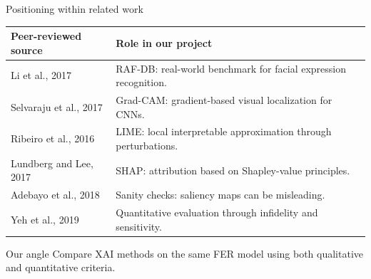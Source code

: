 \documentclass[aspectratio=169,10pt]{beamer}
\begin{document}
\begin{frame}{Positioning within related work}
  \begin{table}
    \small
    \begin{tabular}{p{} p{}}
      \toprule
      Peer-reviewed source & Role in our project \\
      \midrule
      Li et al., 2017 & RAF-DB: real-world benchmark for facial expression recognition. \\
      Selvaraju et al., 2017 & Grad-CAM: gradient-based visual localization for CNNs. \\
      Ribeiro et al., 2016 & LIME: local interpretable approximation through perturbations. \\
      Lundberg and Lee, 2017 & SHAP: attribution based on Shapley-value principles. \\
      Adebayo et al., 2018 & Sanity checks: saliency maps can be misleading. \\
      Yeh et al., 2019 & Quantitative evaluation through infidelity and sensitivity. \\
      \bottomrule
    \end{tabular}
  \end{table}

  \begin{block}{Our angle}
    Compare XAI methods on the same FER model using both qualitative and quantitative criteria.
  \end{block}
\end{frame}
\end{document}
